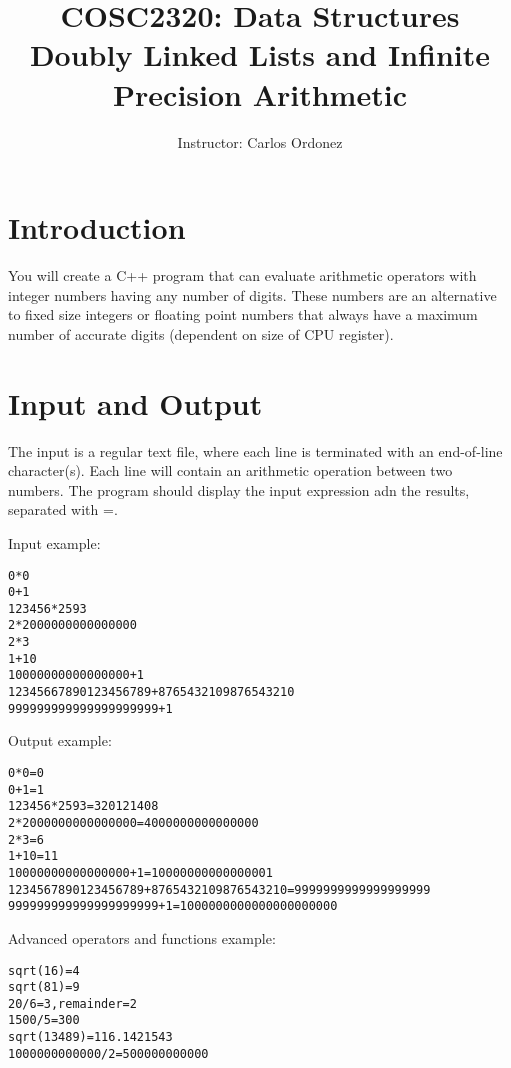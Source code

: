 

\title{COSC2320: Data Structures\\
Doubly Linked Lists and Infinite Precision Arithmetic
}

\author{Instructor: Carlos Ordonez}
\date{}



\pagestyle{plain}
\let\thepage\relax  %

\maketitle

\section{Introduction}

You will create a C++ program that
can evaluate arithmetic operators with integer numbers having any number of digits.
These numbers are an alternative to fixed size integers or floating
point numbers that always have a maximum number of accurate digits 
(dependent on size of CPU register).

\section{Input and Output}

The input is a regular text file, where each line
is terminated with an end-of-line character(s).
Each line will contain an arithmetic operation
between two numbers.
The program should display the input expression adn the results, separated with =.

Input example:
\begin{verbatim}
0*0
0+1
123456*2593
2*2000000000000000
2*3
1+10
10000000000000000+1
12345667890123456789+8765432109876543210
999999999999999999999+1
\end{verbatim}

Output example:
\begin{verbatim}
0*0=0
0+1=1
123456*2593=320121408
2*2000000000000000=4000000000000000
2*3=6
1+10=11
10000000000000000+1=10000000000000001
1234567890123456789+8765432109876543210=9999999999999999999
999999999999999999999+1=1000000000000000000000
\end{verbatim}



Advanced operators and functions example:
\begin{verbatim}
sqrt(16)=4
sqrt(81)=9
20/6=3,remainder=2
1500/5=300
sqrt(13489)=116.1421543
1000000000000/2=500000000000
\end{verbatim}



